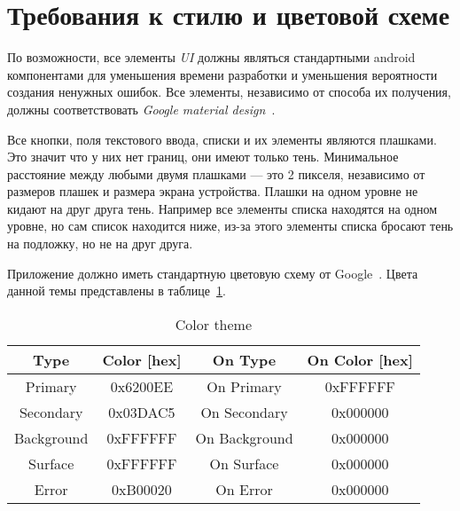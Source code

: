 \section{Требования к стилю и цветовой схеме}

По возможности, все элементы \emph{UI} должны являться стандартными android компонентами для уменьшения времени разработки и уменьшения вероятности создания ненужных ошибок. Все элементы, независимо от способа их получения, должны соответствовать \emph{Google material design}~\cite{design}.

Все кнопки, поля текстового ввода, списки и их элементы являются плашками. Это значит что у них нет границ, они имеют только тень. Минимальное расстояние между любыми двумя плашками --- это 2 пикселя, независимо от размеров плашек и размера экрана устройства. Плашки на одном уровне не кидают на друг друга тень. Например все элементы списка находятся на одном уровне, но сам список находится ниже, из-за этого элементы списка бросают тень на подложку, но не на друг друга.

Приложение должно иметь стандартную цветовую схему от Google~\cite{colors}. Цвета данной темы представлены в таблице~\ref{tbl:theme}.

\begin{table}[H]
    \centering
    \caption{\label{tbl:theme}Color theme}
    \begin{tabular}{|c|c|c|c|}
        \hline
        Type & Color [hex] & On Type & On Color [hex]\\
        \hline
        Primary & 0x6200EE & On Primary & 0xFFFFFF\\
        Secondary & 0x03DAC5 & On Secondary & 0x000000\\
        Background & 0xFFFFFF & On Background & 0x000000\\
        Surface & 0xFFFFFF & On Surface & 0x000000\\
        Error & 0xB00020 & On Error & 0x000000\\
        \hline
    \end{tabular}
\end{table}

